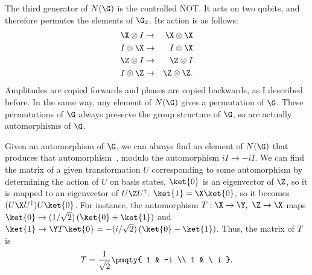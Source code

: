 The third generator of $N(\G)$ is the controlled NOT.  It acts on two qubits,
and therefore permutes the elements of $\G_2$.  Its action is as follows:
\begin{eqnarray}
	\X \otimes I & \rightarrow & \X \otimes \X \nonumber \\
	I \otimes \X & \rightarrow & I \otimes \X \\
	\Z \otimes I & \rightarrow & \Z \otimes I \nonumber \\
	I \otimes \Z & \rightarrow & \Z \otimes \Z \nonumber.
\end{eqnarray}
Amplitudes are copied forwards and phases are copied backwards, as I
described before.  In the same way, any element of $N(\G)$ gives a
permutation of $\G$.  These permutations of $\G$ always preserve the
group structure of $\G$, so are actually automorphisms of $\G$.

Given an automorphism of $\G$, we can always find an element of $N(\G)$
that produces that automorphism~\cite{gottesman-fault-tol}, modulo the
automorphism $iI \rightarrow -iI$.  We can find the matrix of a given
transformation $U$ corresponding to some automorphism by determining
the action of $U$ on basis states.  $\ket{0}$ is an eigenvector of $\Z$, so it
is mapped to an eigenvector of $U \Z U^\dagger$.  $\ket{1} = \X \ket{0}$,
so it becomes $(U \X U^\dagger) U \ket{0}$.  For instance, the
automorphism $T: \X \rightarrow \Y,\ \Z \rightarrow \X$ maps $\ket{0}
\rightarrow (1 / \sqrt{2})\,(\ket{0} + \ket{1})$ and $\ket{1}
\rightarrow \Y T \ket{0} = -(i / \sqrt{2})\,(\ket{0} - \ket{1})$.  Thus,
the matrix of $T$ is
\begin{equation}
	T = \frac{1}{\sqrt{2}} \pmqty{ 1 & -i \\ 1 & \ i }.
\end{equation}

